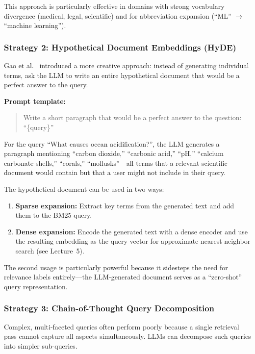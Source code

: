 \documentclass[11pt,a4paper]{article}
\theoremstyle{definition}
\theoremstyle{plain}
\begin{document}
This approach is particularly effective in domains with strong vocabulary divergence (medical, legal, scientific) and for abbreviation expansion (``ML'' $\to$ ``machine learning'').

\subsubsection{Strategy 2: Hypothetical Document Embeddings (HyDE)}

Gao et al.~\cite{gao2023hyde} introduced a more creative approach: instead of generating individual terms, ask the LLM to write an entire hypothetical document that would be a perfect answer to the query.

\textbf{Prompt template:}
\begin{quote}
\ttfamily Write a short paragraph that would be a perfect answer to the question: ``\{query\}''
\end{quote}

For the query ``What causes ocean acidification?'', the LLM generates a paragraph mentioning ``carbon dioxide,'' ``carbonic acid,'' ``pH,'' ``calcium carbonate shells,'' ``corals,'' ``mollusks''---all terms that a relevant scientific document would contain but that a user might not include in their query.

The hypothetical document can be used in two ways:
\begin{enumerate}
    \item \textbf{Sparse expansion:} Extract key terms from the generated text and add them to the BM25 query.
    \item \textbf{Dense expansion:} Encode the generated text with a dense encoder and use the resulting embedding as the query vector for approximate nearest neighbor search (see Lecture~5).
\end{enumerate}

The second usage is particularly powerful because it sidesteps the need for relevance labels entirely---the LLM-generated document serves as a ``zero-shot'' query representation.

\subsubsection{Strategy 3: Chain-of-Thought Query Decomposition}

Complex, multi-faceted queries often perform poorly because a single retrieval pass cannot capture all aspects simultaneously. LLMs can decompose such queries into simpler sub-queries.
\end{document}
